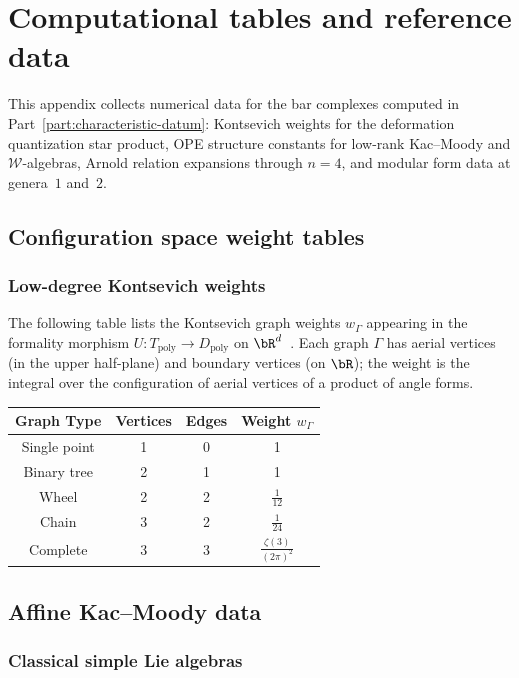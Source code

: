 \chapter[Tables]{Computational tables and reference data}
\label{app:computational-tables}

This appendix collects numerical data for the bar complexes computed in Part~\ref{part:characteristic-datum}: Kontsevich weights for the deformation quantization star product, OPE structure constants for low-rank Kac--Moody and $\mathcal{W}$-algebras, Arnold relation expansions through $n = 4$, and modular form data at genera~$1$ and~$2$.

\section{Configuration space weight tables}

\subsection{Low-degree Kontsevich weights}

The following table lists the Kontsevich graph weights $w_\Gamma$ appearing in the formality morphism $U \colon T_{\mathrm{poly}} \to D_{\mathrm{poly}}$ on $\bR^d$~\cite{Kon03}. Each graph $\Gamma$ has aerial vertices (in the upper half-plane) and boundary vertices (on $\bR$); the weight is the integral over the configuration of aerial vertices of a product of angle forms.

\begin{center}
\begin{tabular}{|c|c|c|c|}
\hline
Graph Type & Vertices & Edges & Weight $w_\Gamma$ \\
\hline
Single point & 1 & 0 & 1 \\
\hline
Binary tree & 2 & 1 & 1 \\
\hline
Wheel & 2 & 2 & $\frac{1}{12}$ \\
\hline
Chain & 3 & 2 & $\frac{1}{24}$ \\
\hline
Complete & 3 & 3 & $\frac{\zeta(3)}{(2\pi)^2}$ \\
\hline
\end{tabular}
\end{center}

\section{Affine Kac--Moody data}

\subsection{Classical simple Lie algebras}

